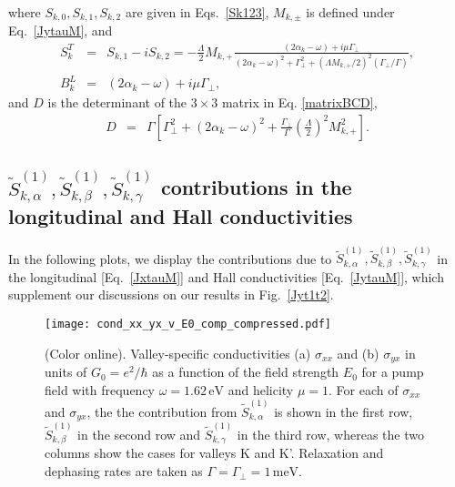 \documentclass[reprint,amsmath,amssymb,aps,prb]{revtex4-1}
\begin{document}
\begin{widetext}
\begin{eqnarray}
\end{eqnarray}
%
where $S_{k,0}, S_{k,1}, S_{k,2}$ are given in Eqs.~\eqref{Sk123}, $M_{k,\pm}$ is defined under Eq.~\eqref{JytauM}, and 
%
\begin{eqnarray}
S_k^T&=&S_{k,1}-iS_{k,2}=-\frac{\Lambda}{2}M_{k,+}\frac{(2
\alpha_k-\omega)+i\mu\Gamma_\perp}{(2\alpha_k-\omega)^2+\Gamma_\perp^2+\left(\Lambda M_{k,+}/2\right)^2\left({\Gamma_\perp}/{\Gamma}\right)}, \\
B_k^L&=&(2\alpha_k-\omega)+i\mu\Gamma_\perp,
\end{eqnarray}
%
and $D$ is  the determinant of the $3\times3$ matrix in Eq. \eqref{matrixBCD},
%
\begin{eqnarray}
 D&=&\Gamma\left[\Gamma_\perp^2+(2\alpha_k-\omega)^2+\frac{\Gamma_\perp}{\Gamma}\left(\frac{\Lambda}{2}\right)^2M_{k,+}^2\right].  
\end{eqnarray}

\subsection{$\tilde{S}_{k,\alpha}^{(1)}, \tilde{S}_{k,\beta}^{(1)},\tilde{S}_{k,\gamma}^{(1)}$ contributions in the longitudinal and Hall conductivities}

In the following plots, we display the contributions due to $\tilde{S}_{k,\alpha}^{(1)}, \tilde{S}_{k,\beta}^{(1)},\tilde{S}_{k,\gamma}^{(1)}$ in the longitudinal [Eq.~\eqref{JxtauM}] and Hall conductivities [Eq.~\eqref{JytauM}], which supplement our discussions on our results in Fig.~\ref{Jyt1t2}.
%
\begin{figure}[htb]
  \texttt{[image: cond\_xx\_yx\_v\_E0\_comp\_compressed.pdf]}
  \caption{(Color online). Valley-specific conductivities (a) $\sigma_{xx}$ and (b) $\sigma_{yx}$ in units of $G_0 = e^2/\hbar$ as a function of the field strength $E_0$ for a pump field with frequency $\omega = 1.62\,\mathrm{eV}$ and helicity  $\mu = 1$. For each of $\sigma_{xx}$ and  $\sigma_{yx}$, the the contribution from $\tilde{S}_{k,\alpha}^{(1)}$ is  shown in the first row, $\tilde{S}_{k,\beta}^{(1)}$ in the second row and $\tilde{S}_{k,\gamma}^{(1)}$ in the third row, whereas the two columns show the cases  for valleys K and K'. Relaxation and dephasing rates are taken as $\Gamma = \Gamma_{\perp} = 1\,\mathrm{meV}$. } \label{condxx_xy_E0}
\end{figure}
%
\end{widetext}


\end{document}
